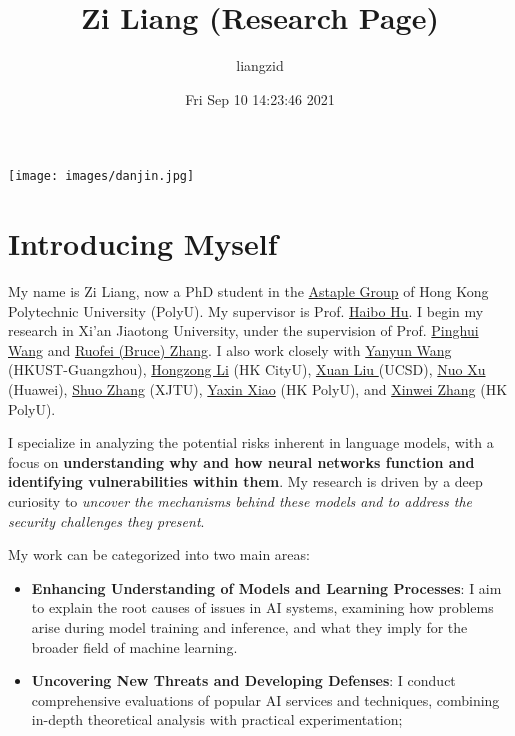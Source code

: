 \documentclass[11pt]{article}
\author{liangzid}
\date{Fri Sep 10 14:23:46 2021}
\title{Zi Liang (Research Page)}
\begin{document}
\maketitle
\tableofcontents

\begin{center}
\texttt{[image: images/danjin.jpg]}
\end{center}
\section{Introducing Myself}
\label{sec:org41a033a}
My name is Zi Liang, now a PhD student in the \href{https://www.astaple.com/}{Astaple Group} of Hong Kong Polytechnic University (PolyU). My supervisor is Prof. \href{https://haibohu.org/}{Haibo Hu}. I begin my research in Xi'an Jiaotong University, under the supervision of Prof. \href{https://gr.xjtu.edu.cn/web/phwang}{Pinghui Wang} and \href{https://www.linkedin.com/in/ruofei}{Ruofei (Bruce) Zhang}.
I also work closely with \href{https://yywang.netlify.app/}{Yanyun Wang} (HKUST-Guangzhou), \href{https://hongzongli-cs.github.io/}{Hongzong Li} (HK CityU),  \href{https://xuanl17.github.io/}{Xuan Liu }(UCSD), \href{https://scholar.google.com.hk/citations?user=XzO2dV0AAAAJ\&hl=zh-CN}{Nuo Xu} (Huawei), \href{https://scholar.google.com.hk/citations?user=Wd5IdkMAAAAJ\&hl=zh-TW}{Shuo Zhang} (XJTU), \href{https://scholar.google.com/citations?user=spRkQ2oAAAAJ\&hl=en}{Yaxin Xiao} (HK PolyU), and \href{https://xinweizhang1998.github.io/}{Xinwei Zhang} (HK PolyU).

I specialize in analyzing the potential risks inherent in language models, with a focus on \textbf{understanding why and how neural networks function and identifying vulnerabilities within them}. My research is driven by a deep curiosity to \emph{uncover the mechanisms behind these models and to address the security challenges they present}.

My work can be categorized into two main areas:

\begin{itemize}
\item \textbf{Enhancing Understanding of Models and Learning Processes}: I aim to explain the root causes of issues in AI systems, examining how problems arise during model training and inference, and what they imply for the broader field of machine learning.
\item \textbf{Uncovering New Threats and Developing Defenses}: I conduct comprehensive evaluations of popular AI services and techniques, combining in-depth theoretical analysis with practical experimentation;
\end{itemize}
\end{document}
